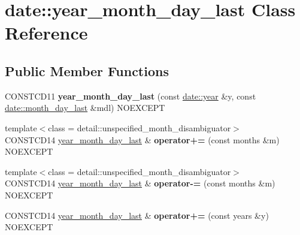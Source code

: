 \hypertarget{classdate_1_1year__month__day__last}{}\section{date\+::year\+\_\+month\+\_\+day\+\_\+last Class Reference}
\label{classdate_1_1year__month__day__last}
\subsection*{Public Member Functions}
\begin{DoxyCompactItemize}
\item 
\mbox{\label{classdate_1_1year__month__day__last_a03d883aced2763fb7845f82d96c9a5a2}} 
C\+O\+N\+S\+T\+C\+D11 {\bfseries year\+\_\+month\+\_\+day\+\_\+last} (const \mbox{\hyperlink{classdate_1_1year}{date\+::year}} \&y, const \mbox{\hyperlink{classdate_1_1month__day__last}{date\+::month\+\_\+day\+\_\+last}} \&mdl) N\+O\+E\+X\+C\+E\+PT
\item 
\mbox{\label{classdate_1_1year__month__day__last_a157abac2456828b5dbecfa51d10c09be}} 
{\footnotesize template$<$class  = detail\+::unspecified\+\_\+month\+\_\+disambiguator$>$ }\\C\+O\+N\+S\+T\+C\+D14 \mbox{\hyperlink{classdate_1_1year__month__day__last}{year\+\_\+month\+\_\+day\+\_\+last}} \& {\bfseries operator+=} (const months \&m) N\+O\+E\+X\+C\+E\+PT
\item 
\mbox{\label{classdate_1_1year__month__day__last_ab6872289a1b836ef5c69c897b63a8ce3}} 
{\footnotesize template$<$class  = detail\+::unspecified\+\_\+month\+\_\+disambiguator$>$ }\\C\+O\+N\+S\+T\+C\+D14 \mbox{\hyperlink{classdate_1_1year__month__day__last}{year\+\_\+month\+\_\+day\+\_\+last}} \& {\bfseries operator-\/=} (const months \&m) N\+O\+E\+X\+C\+E\+PT
\item 
\mbox{\label{classdate_1_1year__month__day__last_af5984d2a2858a070aad955c8c90bf714}} 
C\+O\+N\+S\+T\+C\+D14 \mbox{\hyperlink{classdate_1_1year__month__day__last}{year\+\_\+month\+\_\+day\+\_\+last}} \& {\bfseries operator+=} (const years \&y) N\+O\+E\+X\+C\+E\+PT
\item 

\end{DoxyCompactItemize}
